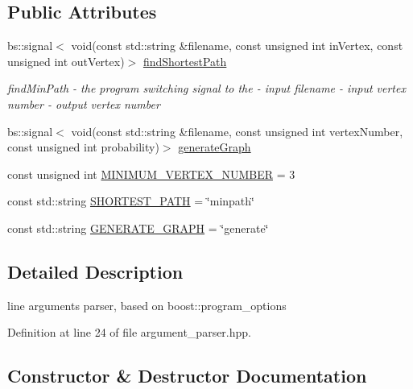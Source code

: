 \subsection*{Public Attributes}
\begin{DoxyCompactItemize}
\item 
bs\+::signal$<$ void(const std\+::string \&filename, const unsigned int in\+Vertex, const unsigned int out\+Vertex)$>$ \hyperlink{classmin__path_1_1argument__parser_1_1_argument_parser_a7eb42d6b80eabc27953b1e2ddb08f7f1}{find\+Shortest\+Path}
\begin{DoxyCompactList}\small\item\em find\+Min\+Path -\/ the program switching signal to the   -\/ input filename  -\/ input vertex number  -\/ output vertex number \end{DoxyCompactList}\item 
bs\+::signal$<$ void(const std\+::string \&filename, const unsigned int vertex\+Number, const unsigned int probability)$>$ \hyperlink{classmin__path_1_1argument__parser_1_1_argument_parser_a5a6e6dd3ac7502d0269b2756383f1923}{generate\+Graph}
\item 
const unsigned int \hyperlink{classmin__path_1_1argument__parser_1_1_argument_parser_a25b69ee820b15148121a85e344f6d26a}{M\+I\+N\+I\+M\+U\+M\+\_\+\+V\+E\+R\+T\+E\+X\+\_\+\+N\+U\+M\+B\+ER} = 3
\item 
const std\+::string \hyperlink{classmin__path_1_1argument__parser_1_1_argument_parser_a552c30c543bb251f8c43b528ce8d3537}{S\+H\+O\+R\+T\+E\+S\+T\+\_\+\+P\+A\+TH} = \char`\"{}minpath\char`\"{}
\item 
const std\+::string \hyperlink{classmin__path_1_1argument__parser_1_1_argument_parser_a4b56bd44886c90debd323f54761489a6}{G\+E\+N\+E\+R\+A\+T\+E\+\_\+\+G\+R\+A\+PH} = \char`\"{}generate\char`\"{}
\end{DoxyCompactItemize}


\subsection{Detailed Description}
line arguments parser, based on boost\+::program\+\_\+options 

Definition at line 24 of file argument\+\_\+parser.\+hpp.



\subsection{Constructor \& Destructor Documentation}
